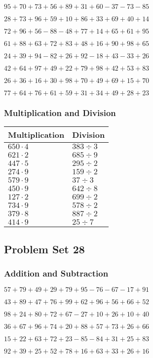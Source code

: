\(95+70+73+56+89+31+60-37-73-85\)

\(28+73+96+59+10+86+33+69+40+14\)

\(72+96+56-88-48+77+14+65+61+95\)

\(61+88+63+72+83+48+16+90+98+65\)

\(24+39+94-82+26+92-18+43-33+26\)

\(42+64+97+49+22+79+98+42+53+83\)

\(26+36+16+30+98+70+49+69+15+70\)

\(77+64+76+61+59+31+34+49+28+23\)

\hypertarget{multiplication-and-division-26}{%
\subsubsection{Multiplication and
Division}\label{multiplication-and-division-26}}

\begin{longtable}[]{@{}ll@{}}
\toprule
Multiplication & Division\tabularnewline
\midrule
\endhead
\(650\cdot4\) & \(383÷3\)\tabularnewline
\(621\cdot2\) & \(685÷9\)\tabularnewline
\(447\cdot5\) & \(295÷2\)\tabularnewline
\(274\cdot9\) & \(159÷2\)\tabularnewline
\(579\cdot9\) & \(37÷3\)\tabularnewline
\(450\cdot9\) & \(642÷8\)\tabularnewline
\(127\cdot2\) & \(699÷2\)\tabularnewline
\(734\cdot9\) & \(578÷2\)\tabularnewline
\(379\cdot8\) & \(887÷2\)\tabularnewline
\(414\cdot9\) & \(25÷7\)\tabularnewline
\bottomrule
\end{longtable}

\hypertarget{problem-set-28}{%
\subsection{Problem Set 28}\label{problem-set-28}}

\hypertarget{addition-and-subtraction-27}{%
\subsubsection{Addition and
Subtraction}\label{addition-and-subtraction-27}}

\(57+79+49+29+79+95-76-67-17+91\)

\(43+89+47+76+99+62+96+56+66+52\)

\(98+24+80+72+67-27+10+26+10+40\)

\(36+67+96+74+20+88+57+73+26+66\)

\(15+22+63+72+23-85-84+31+25+83\)

\(92+39+25+52+78+16+63+33+26+16\)

